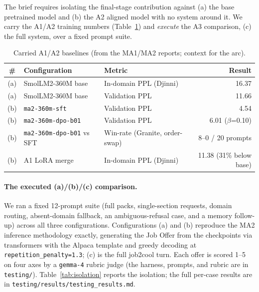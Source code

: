 The brief requires isolating the final-stage contribution against (a) the base pretrained
model and (b) the A2 aligned model with no system around it. We carry the A1/A2 training
numbers (Table~\ref{tab:carried}) and \emph{execute} the A3 comparison, (c) the full system,
over a fixed prompt suite.

\begin{table}[h]
\centering
\caption{Carried A1/A2 baselines (from the MA1/MA2 reports; context for the arc).}
\label{tab:carried}
\begin{tabular}{cllr}
\toprule
\textbf{\#} & \textbf{Configuration} & \textbf{Metric} & \textbf{Result} \\
\midrule
(a) & SmolLM2-360M base            & In-domain PPL (Djinni)                & 16.37 \\
(a) & SmolLM2-360M base            & Validation PPL                        & 11.66 \\
(b) & \texttt{ma2-360m-sft}        & Validation PPL                        & 4.54  \\
(b) & \texttt{ma2-360m-dpo-b01}    & Validation PPL                        & 6.01 ($\beta$=0.10) \\
(b) & \texttt{ma2-360m-dpo-b01} vs SFT & Win-rate (Granite, order-swap) & 8--0 / 20 prompts \\
(b) & A1 LoRA merge                & In-domain PPL (Djinni)                & 11.38 (31\% below base) \\
\bottomrule
\end{tabular}
\end{table}

\paragraph{The executed (a)/(b)/(c) comparison.}
We ran a fixed 12-prompt suite (full packs, single-section requests, domain routing,
absent-domain fallback, an ambiguous-refusal case, and a memory follow-up) across all three
configurations. Configurations (a) and (b) reproduce the MA2 inference methodology exactly,
generating the Job Offer from the checkpoints via transformers with the Alpaca template and
greedy decoding at \verb|repetition_penalty=1.3|; (c) is the full job2cool turn. Each offer is
scored 1--5 on four axes by a \verb|gemma-4| rubric judge (the harness, prompts, and rubric
are in \texttt{testing/}). Table~\ref{tab:isolation} reports the isolation; the full per-case
results are in \texttt{testing/results/testing\_results.md}.

